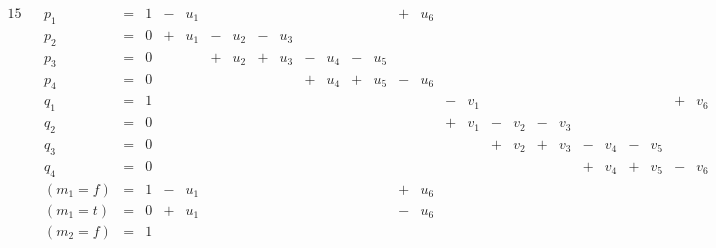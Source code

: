 \documentclass{scrartcl}
\begin{document}
\begin{alignat*}{15}
&& p_1 &{}={}& 1
  &{}-{}& u_1 &     &     &     &     &     &     &     &     &{}+{}& u_6 
  &     &     &     &     &     &     &     &     &     &     &     &     \\
&& p_2 &{}={}& 0
  &{}+{}& u_1 &{}-{}& u_2 &{}-{}& u_3 &     &     &     &     &     &     
  &     &     &     &     &     &     &     &     &     &     &     &     \\
&& p_3 &{}={}& 0
  &     &     &{}+{}& u_2 &{}+{}& u_3 &{}-{}& u_4 &{}-{}& u_5 &     &     
  &     &     &     &     &     &     &     &     &     &     &     &     \\
&& p_4 &{}={}& 0
  &     &     &     &     &     &     &{}+{}& u_4 &{}+{}& u_5 &{}-{}& u_6
  &     &     &     &     &     &     &     &     &     &     &     &     \\
&& q_1 &{}={}& 1
  &     &     &     &     &     &     &     &     &     &     &     &     
  &{}-{}& v_1 &     &     &     &     &     &     &     &     &{}+{}& v_6 \\
&& q_2 &{}={}& 0
  &     &     &     &     &     &     &     &     &     &     &     &    
  &{}+{}& v_1 &{}-{}& v_2 &{}-{}& v_3 &     &     &     &     &     &     \\
&& q_3 &{}={}& 0
  &     &     &     &     &     &     &     &     &     &     &     &     
  &     &     &{}+{}& v_2 &{}+{}& v_3 &{}-{}& v_4 &{}-{}& v_5 &     &     \\
&& q_4 &{}={}& 0
  &     &     &     &     &     &     &     &     &     &     &     &     
  &     &     &     &     &     &     &{}+{}& v_4 &{}+{}& v_5 &{}-{}& v_6 \\
&& (m_1=f) &{}={}& 1
  &{}-{}& u_1 &     &     &     &     &     &     &     &     &{}+{}& u_6     
  &     &     &     &     &     &     &     &     &     &     &     &     \\
&& (m_1=t) &{}={}& 0
  &{}+{}& u_1 &     &     &     &     &     &     &     &     &{}-{}& u_6     
  &     &     &     &     &     &     &     &     &     &     &     &     \\
&& (m_2=f) &{}={}& 1
  &     &     &     &     &     &     &     &     &     &     &     &     

\end{alignat*}
\end{document}
